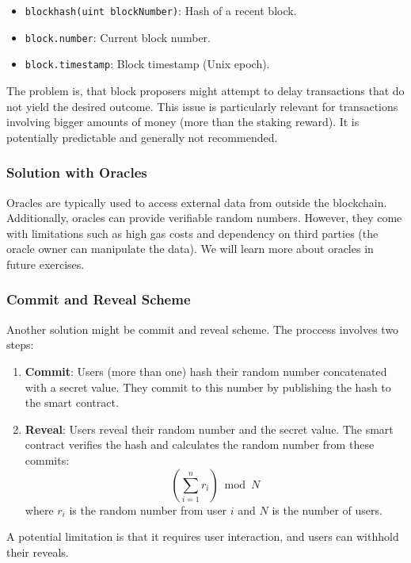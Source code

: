 \documentclass[12pt]{article}
\begin{document}
\begin{itemize}
    \item \texttt{blockhash(uint blockNumber)}: Hash of a recent block.
    \item \texttt{block.number}: Current block number.
    \item \texttt{block.timestamp}: Block timestamp (Unix epoch).
\end{itemize}

\noindent
The problem is, that block proposers might attempt to delay transactions that do not yield the desired outcome. This issue is particularly relevant for transactions involving bigger amounts of money (more than the staking reward). It is potentially predictable and generally not recommended.

\subsubsection*{Solution with Oracles} Oracles are typically used to access external data from outside the blockchain. Additionally, oracles can provide verifiable random numbers. However, they come with limitations such as high gas costs and dependency on third parties (the oracle owner can manipulate the data). We will learn more about oracles in future exercises.

\subsubsection*{Commit and Reveal Scheme} Another solution might be commit and reveal scheme. The proccess involves two steps:
\begin{enumerate}
    \item \textbf{Commit}: Users (more than one) hash their random number concatenated with a secret value. They commit to this number by publishing the hash to the smart contract.
    \item \textbf{Reveal}: Users reveal their random number and the secret value. The smart contract verifies the hash and calculates the random number from these commits:
    \[
    \left( \sum_{i=1}^{n} r_i \right) \bmod N
    \]
    where $r_i$ is the random number from user $i$ and $N$ is the number of users.
\end{enumerate}
\noindent
A potential limitation is that it requires user interaction, and users can withhold their reveals.
\end{document}
